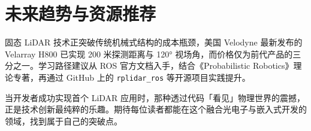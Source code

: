 \chapter{未来趋势与资源推荐}
固态 LiDAR 技术正突破传统机械式结构的成本瓶颈，美国 Velodyne 最新发布的 Velarray H800 已实现 200 米探测距离与 120° 视场角，而价格仅为前代产品的三分之一。学习路径建议从 ROS 官方文档入手，结合《Probabilistic Robotics》理论专著，再通过 GitHub 上的 \verb!rplidar_ros! 等开源项目实践提升。\par
当开发者成功实现首个 LiDAR 应用时，那种透过代码「看见」物理世界的震撼，正是技术创新最纯粹的乐趣。期待每位读者都能在这个融合光电子与嵌入式开发的领域，找到属于自己的突破点。\par

